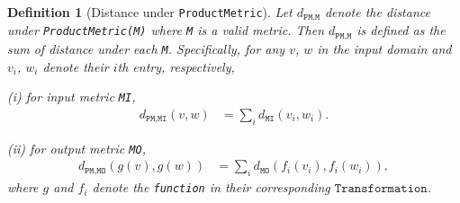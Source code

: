 \documentclass[11pt,a4paper]{article}
\newtheorem{definition}{Definition}
\begin{document}
    \begin{definition}[Distance under \texttt{ProductMetric}]\label{def:prodm}
     Let $d_{\texttt{PM,M}}$ denote the distance under \texttt{ProductMetric(M)} where \texttt{M} is a valid metric. Then $d_{\texttt{PM,M}}$ is defined as the sum of distance under each \texttt{M}. Specifically, for any $v$, $w$ in the input domain and $v_i$, $w_i$ denote their $i$th entry, respectively, 
     
     (i) for input metric \texttt{MI}, 
     \begin{equation*}
    \begin{aligned}
        d_{\texttt{PM,MI}}(v,w) &
        = \sum_{i} d_{\texttt{MI}}(v_i, w_i).
    \end{aligned}
    \end{equation*}
 
     (ii) for output metric \texttt{MO},
    \begin{equation*}
    \begin{aligned} 
        d_{\texttt{PM,MO}}(g(v), g(w)) &
        = \sum_{i} d_{\texttt{MO}}(f_i(v_i), f_i(w_i)),
    \end{aligned}
    \end{equation*} 
    where $g$ and $f_i$ denote the \texttt{function} in their corresponding $\texttt{Transformation}$.
    \end{definition}
    
\end{document}

